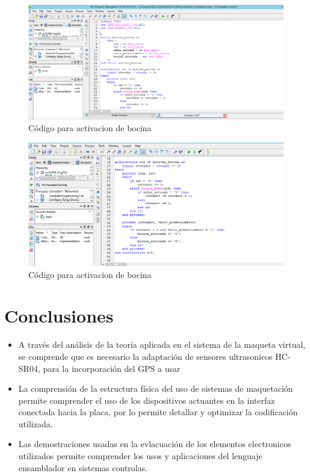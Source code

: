 \documentclass[osajnl,twocolumn,showpacs,superscriptaddress,10pt]{revtex4-1}
\begin{document}
\begin{figure}[H]
    \centering
    \includegraphics[scale=0.2]{images/2.png}
    \caption{Código para activacion de bocina}
\end{figure}

\begin{figure}[H]
    \centering
    \includegraphics[scale=0.2]{images/3.png}
    \caption{Código para activacion de bocina}
\end{figure}

\section{Conclusiones}
\begin{itemize}
    \item A través del análisis de la teoría aplicada en el sistema de la maqueta virtual, se comprende que es necesario la adaptación de sensores ultrasonicos HC-SR04, para la incorporación del GPS a usar
    
    \item La comprensión de la estructura física del uso de sistemas de maquetación permite comprender el uso de los dispositivos actuantes en la interfaz conectada hacia la placa, por lo permite detallar y optimizar la codificación utilizada. 
    
    \item Las demostraciones usadas en la evlacuación de los elementos electronicos utilizados permite comprender los usos y aplicaciones del lenguaje ensamblador en sistemas controlas.

\end{itemize}
\end{document}
